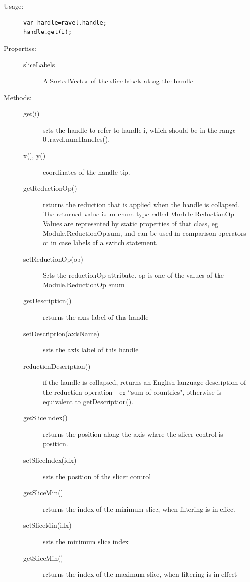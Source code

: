 \documentclass{article}
\begin{document}
\begin{description}
\item[Usage:]\mbox{}
\begin{verbatim}
var handle=ravel.handle;
handle.get(i);
\end{verbatim}

\item[Properties:]\mbox{}
  \begin{description}
  \item[sliceLabels] A SortedVector of the slice labels along the handle.
  \end{description}
  
\item[Methods:]\mbox{}
  \begin{description}
  \item[get(i)] sets the handle to refer to handle i, which should be in
    the range 0..ravel.numHandles().
  \item[x(), y()] coordinates of the handle tip.
  \item[getReductionOp()] returns the reduction that is applied when the
    handle is collapsed. The returned value is an enum type called
    Module.ReductionOp. Values are represented by static properties of
    that class, eg Module.ReductionOp.sum, and can be used in comparison
    operators or in case labels of a switch statement.
  \item[setReductionOp(op)] Sets the reductionOp attribute. op is one of
    the values of the Module.ReductionOp enum.
  \item[getDescription()] returns the axis label of this handle
  \item[setDescription(axisName)] sets the axis label of this handle
  \item[reductionDescription()] if the handle is collapsed, returns an
English language description of the reduction operation - eg ``sum of
countries", otherwise is equivalent to getDescription().
\item[getSliceIndex()] returns the position along the axis where the
  slicer control is position.
\item[setSliceIndex(idx)] sets the position of the slicer control
\item[getSliceMin()] returns the index of the minimum slice, when
  filtering is in effect
\item[setSliceMin(idx)] sets the minimum slice index
\item[getSliceMin()] returns the index of the maximum slice, when
  filtering is in effect

\end{description}
\end{description}
\end{document}
